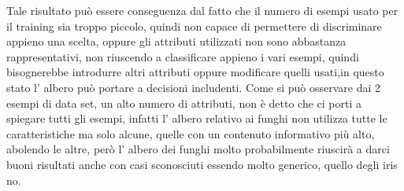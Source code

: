 	    Tale risultato può essere conseguenza dal fatto che il numero di esempi usato per il training sia troppo piccolo, quindi non capace di permettere di discriminare appieno una scelta, oppure gli attributi utilizzati non sono abbastanza rappresentativi, non riuscendo a classificare appieno i vari esempi, quindi bisognerebbe introdurre altri attributi oppure modificare quelli usati,in questo stato l' albero può portare a decisioni includenti.
	    Come si può osservare dai 2 esempi di data set, un alto numero di attributi, non è detto che ci porti a spiegare tutti gli esempi, infatti l' albero relativo ai funghi non utilizza tutte le caratteristiche ma solo alcune, quelle con un contenuto informativo più alto, abolendo le altre, però l' albero dei funghi molto probabilmente riuscirà a darci buoni risultati anche con casi sconosciuti essendo molto generico, quello degli iris no.
